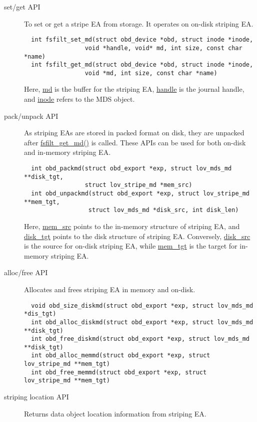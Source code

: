\begin{description}

  \item[set/get API] To set or get a stripe EA from storage. It operates
  on on-disk striping EA.

  \begin{Verbatim}
  int fsfilt_set_md(struct obd_device *obd, struct inode *inode, 
                 void *handle, void* md, int size, const char *name)
  int fsfilt_get_md(struct obd_device *obd, struct inode *inode, 
                 void *md, int size, const char *name)            
  \end{Verbatim}

  Here, \url{md} is the buffer for the striping EA, \url{handle} is the journal
  handle, and \url{inode} refers to the MDS object.
  
  \item[pack/unpack API] As striping EAs are stored in packed format on disk, they
   are unpacked after \url{fsfilt_get_md()} is called. These APIs can be
   used for both on-disk and in-memory striping EA. 
  
  \begin{Verbatim}
  int obd_packmd(struct obd_export *exp, struct lov_mds_md **disk_tgt,
                 struct lov_stripe_md *mem_src)
  int obd_unpackmd(struct obd_export *exp, struct lov_stripe_md **mem_tgt,
                  struct lov_mds_md *disk_src, int disk_len)
  \end{Verbatim}
  
  Here, \url{mem_src} points to the in-memory structure of striping EA, and \url{disk_tgt}
  points to the disk structure of striping EA. Conversely, \url{disk_src} is the source
  for on-disk striping EA, while \url{mem_tgt} is the  target for in-memory
  striping EA.
  
  \item[alloc/free API] Allocates and frees striping EA in memory and on-disk. 
  \begin{Verbatim}
  void obd_size_diskmd(struct obd_export *exp, struct lov_mds_md *dis_tgt)
  int obd_alloc_diskmd(struct obd_export *exp, struct lov_mds_md **disk_tgt)
  int obd_free_diskmd(struct obd_export *exp, struct lov_mds_md **disk_tgt)
  int obd_alloc_memmd(struct obd_export *exp, struct lov_stripe_md **mem_tgt)
  int obd_free_memmd(struct obd_export *exp, struct lov_stripe_md **mem_tgt)
  \end{Verbatim}
  
  \item[striping location API] Returns data object location information from striping EA.
  

\end{description}
